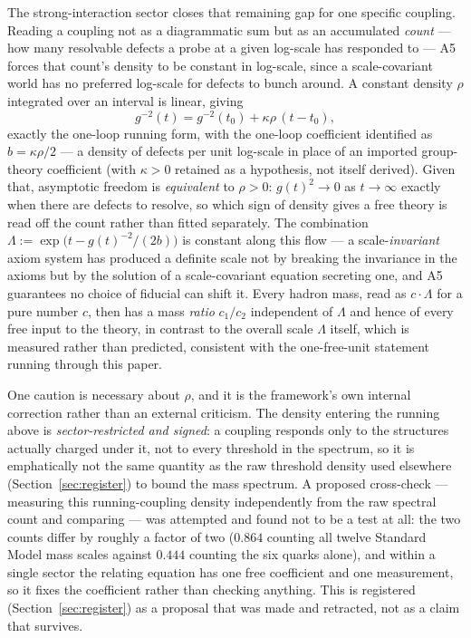 \documentclass[pdflatex,sn-mathphys-num]{sn-jnl}
\theoremstyle{thmstyleone}
\theoremstyle{thmstylethree}
\theoremstyle{thmstyletwo}
\begin{document}
The strong-interaction sector closes that remaining gap for one specific
coupling. Reading a coupling not as a diagrammatic sum but as an
accumulated \emph{count} — how many resolvable defects a probe at a
given log-scale has responded to — A5 forces that count's density to be
constant in log-scale, since a scale-covariant world has no preferred
log-scale for defects to bunch around. A constant density $\rho$
integrated over an interval is linear, giving
\begin{equation}
g^{-2}(t) = g^{-2}(t_0) + \kappa\rho\,(t-t_0),
\end{equation}
exactly the one-loop running form, with the one-loop coefficient
identified as $b=\kappa\rho/2$ — a density of defects per unit log-scale
in place of an imported group-theory coefficient (with $\kappa>0$
retained as a hypothesis, not itself derived). Given that, asymptotic
freedom is \emph{equivalent} to $\rho>0$: $g(t)^2\to0$ as $t\to\infty$
exactly when there are defects to resolve, so which sign of density
gives a free theory is read off the count rather than fitted
separately. The combination
$\Lambda := \exp\bigl(t-g(t)^{-2}/(2b)\bigr)$ is constant along this
flow — a scale-\emph{invariant} axiom system has produced a definite
scale not by breaking the invariance in the axioms but by the solution
of a scale-covariant equation secreting one, and A5 guarantees no choice
of fiducial can shift it. Every hadron mass, read as $c\cdot\Lambda$ for
a pure number $c$, then has a mass \emph{ratio} $c_1/c_2$ independent of
$\Lambda$ and hence of every free input to the theory, in contrast to
the overall scale $\Lambda$ itself, which is measured rather than
predicted, consistent with the one-free-unit statement running through
this paper.

One caution is necessary about $\rho$, and it is the framework's own
internal correction rather than an external criticism. The density
entering the running above is \emph{sector-restricted and signed}: a
coupling responds only to the structures actually charged under it, not
to every threshold in the spectrum, so it is emphatically not the same
quantity as the raw threshold density used elsewhere
(Section~\ref{sec:register}) to bound the mass spectrum. A proposed
cross-check — measuring this running-coupling density independently from
the raw spectral count and comparing — was attempted and found not to be
a test at all: the two counts differ by roughly a factor of two ($0.864$
counting all twelve Standard Model mass scales against $0.444$ counting
the six quarks alone), and within a single sector the relating equation
has one free coefficient and one measurement, so it fixes the
coefficient rather than checking anything. This is registered
(Section~\ref{sec:register}) as a proposal that was made and retracted,
not as a claim that survives.
\end{document}

